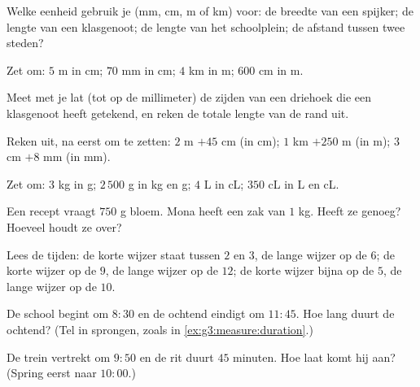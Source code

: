 \begin{exercise}[$\star$]\label{exo:g3:measure:1}
Welke eenheid gebruik je (mm, cm, m of km) voor: de breedte van een
spijker; de lengte van een klasgenoot; de lengte van het schoolplein; de
afstand tussen twee steden?
\end{exercise}

\begin{exercise}[$\star$]\label{exo:g3:measure:2}
Zet om: $5$ m in cm; \quad $70$ mm in cm; \quad $4$ km in m; \quad
$600$ cm in m.
\end{exercise}

\begin{exercise}[$\star$]\label{exo:g3:measure:3}
Meet met je lat (tot op de millimeter) de zijden van een driehoek die een
klasgenoot heeft getekend, en reken de totale lengte van de rand uit.
\end{exercise}

\begin{exercise}[$\star$]\label{exo:g3:measure:4}
Reken uit, na eerst om te zetten: $2$ m $+ 45$ cm (in cm); \quad
$1$ km $+ 250$ m (in m); \quad $3$ cm $+ 8$ mm (in mm).
\end{exercise}

\begin{exercise}[$\star$]\label{exo:g3:measure:5}
Zet om: $3$ kg in g; \quad $2\,500$ g in kg en g; \quad
$4$ L in cL; \quad $350$ cL in L en cL.
\end{exercise}

\begin{exercise}[$\star$]\label{exo:g3:measure:6}
Een recept vraagt $750$ g bloem. Mona heeft een zak van $1$ kg. Heeft ze
genoeg? Hoeveel houdt ze over?
\end{exercise}

\begin{exercise}[$\star$]\label{exo:g3:measure:7}
Lees de tijden: de korte wijzer staat tussen $2$ en $3$, de lange wijzer
op de $6$; de korte wijzer op de $9$, de lange wijzer op de $12$; de
korte wijzer bijna op de $5$, de lange wijzer op de $10$.
\end{exercise}

\begin{exercise}[$\star$]\label{exo:g3:measure:8}
De school begint om $8{:}30$ en de ochtend eindigt om $11{:}45$. Hoe lang
duurt de ochtend? (Tel in sprongen, zoals in
\cref{ex:g3:measure:duration}.)
\end{exercise}

\begin{exercise}[$\star$]\label{exo:g3:measure:9}
De trein vertrekt om $9{:}50$ en de rit duurt $45$ minuten. Hoe laat komt
hij aan? (Spring eerst naar $10{:}00$.)
\end{exercise}

